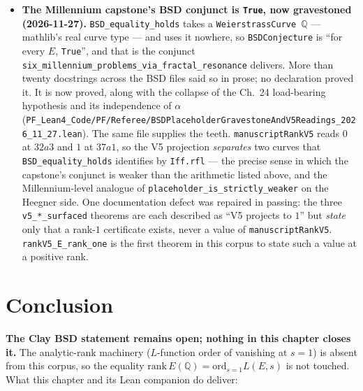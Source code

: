 \begin{itemize}
\item \textbf{The Millennium capstone's BSD conjunct is \texttt{True},
now gravestoned (2026-11-27).} \texttt{BSD\_equality\_holds} takes a
\texttt{WeierstrassCurve}~$\mathbb{Q}$ --- mathlib's real curve type --- and
uses it nowhere, so \texttt{BSDConjecture} is ``for every $E$, \texttt{True}'',
and that is the conjunct
\texttt{six\_millennium\_problems\_via\_fractal\_resonance} delivers. More than
twenty docstrings across the BSD files said so in prose; no declaration proved
it. It is now proved, along with the collapse of the Ch.~24 load-bearing
hypothesis and its independence of $\alpha$
(\texttt{PF\_Lean4\_Code/PF/Referee/BSDPlaceholderGravestoneAndV5Readings\_2026\_11\_27.lean}).
The same file supplies the teeth. \texttt{manuscriptRankV5} reads $0$ at
$32a3$ and $1$ at $37a1$, so the V5 projection \emph{separates} two curves
that \texttt{BSD\_equality\_holds} identifies by \texttt{Iff.rfl} --- the
precise sense in which the capstone's conjunct is weaker than the arithmetic
listed above, and the Millennium-level analogue of
\texttt{placeholder\_is\_strictly\_weaker} on the Heegner side. One
documentation defect was repaired in passing: the three
\texttt{v5\_*\_surfaced} theorems are each described as ``V5 projects to $1$''
but \emph{state} only that a rank-$1$ certificate exists, never a value of
\texttt{manuscriptRankV5}. \texttt{rankV5\_E\_rank\_one} is the first theorem
in this corpus to state such a value at a positive rank.

\end{itemize}

\section{Conclusion}

\textbf{The Clay BSD statement remains open; nothing in this chapter closes it.}  The analytic-rank machinery ($L$-function order of vanishing at $s = 1$) is absent from this corpus, so the equality $\mathrm{rank}\,E(\mathbb{Q}) = \mathrm{ord}_{s=1} L(E, s)$ is not touched.  What this chapter and its Lean companion do deliver:

